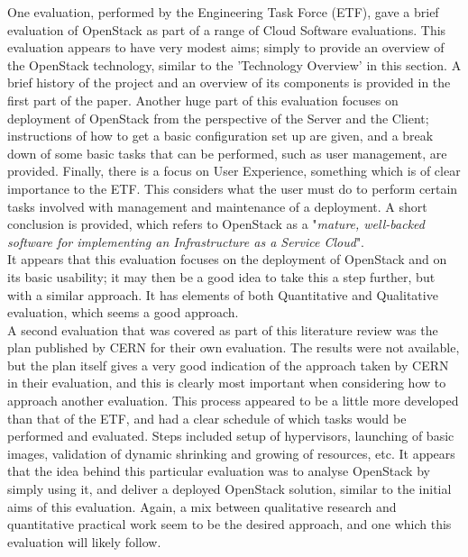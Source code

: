 One evaluation, performed by the Engineering Task Force (ETF)\cite{etfevaluation}, gave a brief evaluation of OpenStack as part of a range of Cloud Software evaluations.
This evaluation appears to have very modest aims; simply to provide an overview of the OpenStack technology, similar to the 'Technology Overview' in this section. A brief history of the project and an overview of its components is provided in the first part of the paper. 
Another huge part of this evaluation focuses on deployment of OpenStack from the perspective of the Server and the Client; instructions of how to get a basic configuration set up are given, and a break down of some basic tasks that can be performed, such as user management, are provided. 
Finally, there is a focus on User Experience, something which is of clear importance to the ETF. This considers what the user must do to perform certain tasks involved with management and maintenance of a deployment. A short conclusion is provided, which refers to OpenStack as a "\textit{mature, well-backed software for
implementing an Infrastructure as a Service Cloud}\cite{etfevaluation}".\\
It appears that this evaluation focuses on the deployment of OpenStack and on its basic usability; it may then be a good idea to take this a step further, but with a similar approach. It has elements of both Quantitative and Qualitative evaluation, which seems a good approach. \\

A second evaluation that was covered as part of this literature review was the plan published by CERN for their own evaluation\cite{cernevaluation}. The results were not available, but the plan itself gives a very good indication of the approach taken by CERN in their evaluation, and this is clearly most important when considering how to approach another evaluation. This process appeared to be a little more developed than that of the ETF, and had a clear schedule of which tasks would be performed and evaluated. Steps included setup of hypervisors, launching of basic images, validation of dynamic shrinking and growing of resources, etc. It appears that the idea behind this particular evaluation was to analyse OpenStack by simply using it, and deliver a deployed OpenStack solution, similar to the initial aims of this evaluation. Again, a mix between qualitative research and quantitative practical work seem to be the desired approach, and one which this evaluation will likely follow. \\

